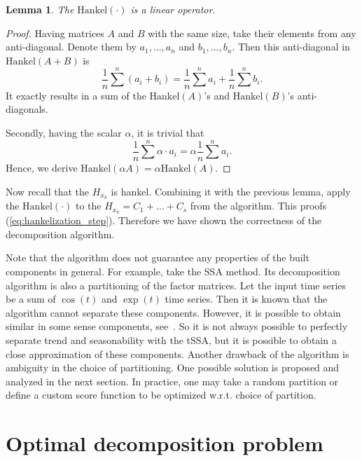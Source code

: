 \documentclass[referee, pdflatex, sn-mathphys-num]{sn-jnl}
\theoremstyle{definition}
\theoremstyle{plain}
\newtheorem{Lem}{Lemma}
\begin{document}
	\begin{Lem}
		The $ \text{Hankel}(\cdot) $ is a linear operator.
	\end{Lem}
	
	\begin{proof}		
		Having matrices $ A $ and $ B $ with the same size, take their elements from any anti-diagonal. Denote them by $ a_1, \ldots, a_n $ and $ b_1, \ldots, b_n $. Then this anti-diagonal in $ \text{Hankel}(A + B) $ is \begin{equation*}
			 \dfrac{1}{n} \sum\limits^n (a_i + b_i) = \dfrac{1}{n} \sum\limits^n a_i + \dfrac{1}{n} \sum\limits^n b_i.
		\end{equation*}	It exactly results in a sum of the $ \text{Hankel}(A) $'s and $ \text{Hankel}(B) $'s anti-diagonals.
		
		Secondly, having the scalar $ \alpha $, it is trivial that \begin{equation*}
			 \dfrac{1}{n} \sum\limits^n \alpha \cdot a_i = \alpha \dfrac{1}{n} \sum\limits^n a_i.
		\end{equation*}	Hence, we derive $ \text{Hankel}(\alpha A) = \alpha \text{Hankel}(A) $.
	\end{proof}
	
	Now recall that the $ H_{x_k} $ is hankel. Combining it with the previous lemma, apply the $ \text{Hankel}(\cdot) $ to the $ H_{x_k} = C_1 + \ldots + C_s $ from the algorithm. This proofs (\ref{eq:hankelization_step}). Therefore we have shown the correctness of the decomposition algorithm.
	
	Note that the algorithm does not guarantee any properties of the built components in general. For example, take the SSA method. Its decomposition algorithm is also a partitioning of the factor matrices. Let the input time series be a sum of $\cos(t)$ and $\exp (t)$ time series. Then it is known that the algorithm cannot separate these components. However, it is possible to obtain similar in some sense components, see~{\cite{ecfb9dc578be43ae9ee8fc88b8ff9151}}. So it is not always possible to perfectly separate trend and seasonability with the tSSA, but it is possible to obtain a close approximation of these components. Another drawback of the algorithm is ambiguity in the choice of partitioning. One possible solution is proposed and analyzed in the next section. In practice, one may take a random partition or define a custom score function to be optimized w.r.t. choice of partition.
	
	\section{Optimal decomposition problem}\label{sec:optimal_decomp}
	
\end{document}
